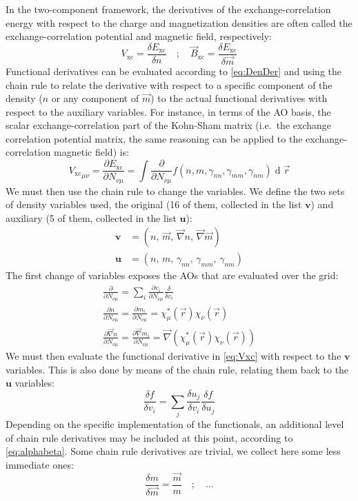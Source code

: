 \documentclass[12pt]{article}
\newcommand{\dd}{\operatorname{d}}
\newcommand*{\grad}{\vec{\nabla}}
\newcommand*{\pder}[2]{\frac{\partial #1}{\partial #2}}
\newcommand*{\dder}[2]{\frac{\delta #1}{\delta #2}}
\begin{document}
In the two-component framework, the derivatives of the exchange-correlation energy with respect to the charge and magnetization densities are often called the exchange-correlation potential and magnetic field, respectively:\cite{Gyorffy01_206403,Scuseria13_035117}
\begin{equation}
 V_\mathrm{xc} = \dder{E_\mathrm{xc}}{n} \quad;\quad \vec{B}_\mathrm{xc} = \dder{E_\mathrm{xc}}{\vec{m}}
\end{equation}
Functional derivatives can be evaluated according to \cref{eq:DenDer} and using the chain rule to relate the derivative with respect to a specific component of the density ($n$ or any component of $\vec{m}$) to the actual functional derivatives with respect to the auxiliary variables.
For instance, in terms of the AO basis, the scalar exchange-correlation part of the Kohn-Sham matrix (i.e.\ the exchange correlation potential matrix, the same reasoning can be applied to the exchange-correlation magnetic field) is:
\begin{equation}
\label{eq:Vxc}
 {V_\mathrm{xc}}_{\mu\nu} = \pder{E_\mathrm{xc}}{N_{\nu\mu}} = \int \pder{}{N_{\nu\mu}}f(n,m,\gamma_{nn},\gamma_{mm},\gamma_{nm})\dd\vec{r}
\end{equation}
We must then use the chain rule to change the variables.
We define the two sets of density variables used, the original (16 of them, collected in the list $\bm{v}$) and auxiliary (5 of them, collected in the list $\bm{u}$):
\begin{align}
 \bm{v} &= ( n ,\,\vec{m} ,\, \grad n ,\, \grad\vec{m} ) \\
 \bm{u} &= ( n ,\, m ,\, \gamma_{nn} ,\, \gamma_{mm} ,\, \gamma_{nm} ) 
\end{align}
The first change of variables exposes the AOs that are evaluated over the grid:
\begin{gather}
 \pder{}{N_{\nu\mu}} = \sum_i \pder{v_i}{N_{\nu\mu}}\dder{}{v_i} \\
 \pder{n}{N_{\nu\mu}} = \pder{m_i}{N_{\nu\mu}} = \chi^*_\mu(\vec{r})\chi_\nu(\vec{r}) \\
 \pder{\grad n}{N_{\nu\mu}} = \pder{\grad m_i}{N_{\nu\mu}} = \grad(\chi^*_\mu(\vec{r})\chi_\nu(\vec{r}))
\end{gather}
We must then evaluate the functional derivative in \cref{eq:Vxc} with respect to the $\bm{v}$ variables.
This is also done by means of the chain rule, relating them back to the $\bm{u}$ variables:
\begin{equation}
 \dder{f}{v_i} = \sum_j \dder{u_j}{v_i}\dder{f}{u_j}
\end{equation}
Depending on the specific implementation of the functionals, an additional level of chain rule derivatives may be included at this point, according to \cref{eq:alphabeta}.
Some chain rule derivatives are trivial, we collect here some less immediate ones:
\begin{equation}
 \dder{m}{\vec{m}} = \frac{\vec{m}}{m} \quad;\quad \dots
\end{equation}
\end{document}

